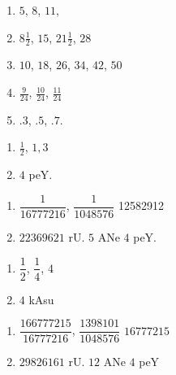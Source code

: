 
\begin{multicols}{3}
\begin{enumerate}[$(1)$]
\item $5$, $8$, $11$,
\item $8 \frac{1}{2}$, $15$, $21\frac{1}{2}$, $28$
\item $10$, $18$, $26$, $34$, $42$, $50$
\item $\frac{9}{24}$, $\frac{10}{24}$, $\frac{11}{24}$
\item $.3$, $.5$, $.7$.
\end{enumerate}
\end{multicols}


\begin{multicols}{2}
\begin{enumerate}[$(1)$]
\item $\frac{1}{2}$, $1, 3$
\item $4$ peY.
\end{enumerate}
\end{multicols}


\begin{multicols}{2}
\begin{enumerate}[$(1)$]
\item $\dfrac{1}{16777216}$, $\dfrac{1}{1048576}$ 12582912
\item $22369621$ rU. $5$ ANe $4$ peY.
\end{enumerate}
\end{multicols}


\begin{multicols}{2}
\begin{enumerate}[$(1)$]
\item $\dfrac{1}{2}$, $\dfrac{1}{4}$, $4$
\item $4$ kAsu
\end{enumerate}
\end{multicols}


\begin{multicols}{2}
\begin{enumerate}[$(1)$]
\item $\dfrac{166777215}{16777216}$, $\dfrac{1398101}{1048576}$
$16777215$
\item $29826161$ rU. $12$ ANe $4$ peY
\end{enumerate}
\end{multicols}

